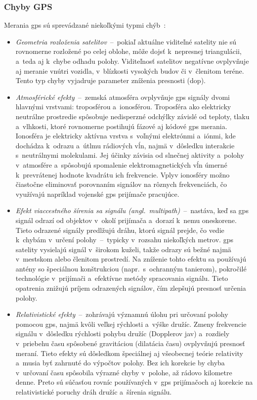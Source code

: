     \subsubsection{Chyby GPS}\label{ssec:gps_error}
      Merania \acrshort{gps} sú sprevádzané niekoľkými typmi chýb~\cite{duchonSnimaceMobilnejRobotike2012}:
      \begin{itemize}
        \item \emph{Geometria rozloženia satelitov}~--~pokiaľ aktuálne viditeľné satelity nie sú rovnomerne rozložené po celej oblohe, môže dojsť k~nepresnej triangulácii, a~teda aj k~chybe odhadu polohy. Viditeľnosť satelitov negatívne ovplyvňuje aj meranie vnútri vozidla, v~blízkosti vysokých budov či v~členitom teréne. Tento typ chyby vyjadruje parameter zníženia presnosti (\acrshort{dop}).
        
        \item \emph{Atmosférické efekty}~--~zemská atmosféra ovplyvňuje \acrshort{gps} signály dvomi hlavnými vrstvami: troposférou a~ionosférou. Troposféra ako elektricky neutrálne prostredie spôsobuje nedisperzné odchýlky závislé od teploty, tlaku a~vlhkosti, ktoré rovnomerne postihujú fázové aj kódové \acrshort{gps} merania. Ionosféra je elektricky aktívna vrstva s~voľnými elektrónmi a~iónmi, kde dochádza k~odrazu a~útlmu rádiových vĺn, najmä v~dôsledku interakcie s~neutrálnymi molekulami. Jej účinky závisia od slnečnej aktivity a~polohy v~atmosfére a~spôsobujú spomalenie elektromagnetických vĺn úmerné k~prevrátenej hodnote kvadrátu ich frekvencie. Vplyv ionosféry možno čiastočne eliminovať porovnaním signálov na rôznych frekvenciách, čo využívajú napríklad vojenské \acrshort{gps} prijímače pracujúce.
        
        \item \emph{Efekt viaccestného šírenia sa signálu (angl.\ multipath)}~--~nastáva, keď sa \acrshort{gps} signál odrazí od objektov v~okolí prijímača a~dorazí k~nemu oneskorene. Tieto odrazené signály predlžujú dráhu, ktorú signál prejde, čo vedie k~chybám v~určení polohy~--~typicky v~rozsahu niekoľkých metrov\@. \acrshort{gps} satelity vysielajú signál v~širokom kuželi, takže odrazy sú bežné najmä v~mestskom alebo členitom prostredí. Na zníženie tohto efektu sa používajú antény so špeciálnou konštrukciou (napr.\ s~ochranným tanierom), pokročilé technológie v~prijímači a~efektívne metódy spracovania signálu. Tieto opatrenia znižujú príjem odrazených signálov, čím zlepšujú presnosť určenia polohy.
        
        \item \emph{Relativistické efekty}~--~zohrávajú významnú úlohu pri určovaní polohy pomocou \acrshort{gps}, najmä kvôli veľkej rýchlosti a~výške družíc. Zmeny frekvencie signálu v~dôsledku rýchlosti pohybu družíc (Dopplerov jav) a~rozdiely v~priebehu času spôsobené gravitáciou (dilatácia času) ovplyvňujú presnosť meraní. Tieto efekty sú dôsledkom špeciálnej aj všeobecnej teórie relativity a~musia byť zahrnuté do výpočtov polohy. Bez ich korekcie by chyba v~určovaní času spôsobila výrazné chyby v~polohe, až rádovo kilometre denne. Preto sú súčasťou rovníc používaných v~\acrshort{gps} prijímačoch aj korekcie na relativistické poruchy dráh družíc a~šírenia signálu.
        

\end{itemize}
